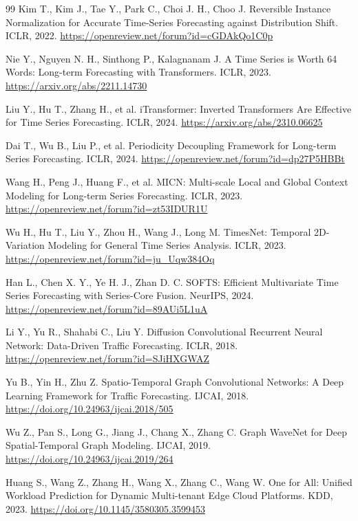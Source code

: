 \documentclass[UTF8]{ctexart}
\begin{document}
\begin{thebibliography}{99}
Kim T., Kim J., Tae Y., Park C., Choi J. H., Choo J. Reversible Instance Normalization for Accurate Time-Series Forecasting against Distribution Shift. ICLR, 2022. \url{https://openreview.net/forum?id=cGDAkQo1C0p}

Nie Y., Nguyen N. H., Sinthong P., Kalagnanam J. A Time Series is Worth 64 Words: Long-term Forecasting with Transformers. ICLR, 2023. \url{https://arxiv.org/abs/2211.14730}

Liu Y., Hu T., Zhang H., et al. iTransformer: Inverted Transformers Are Effective for Time Series Forecasting. ICLR, 2024. \url{https://arxiv.org/abs/2310.06625}

Dai T., Wu B., Liu P., et al. Periodicity Decoupling Framework for Long-term Series Forecasting. ICLR, 2024. \url{https://openreview.net/forum?id=dp27P5HBBt}

Wang H., Peng J., Huang F., et al. MICN: Multi-scale Local and Global Context Modeling for Long-term Series Forecasting. ICLR, 2023. \url{https://openreview.net/forum?id=zt53IDUR1U}

Wu H., Hu T., Liu Y., Zhou H., Wang J., Long M. TimesNet: Temporal 2D-Variation Modeling for General Time Series Analysis. ICLR, 2023. \url{https://openreview.net/forum?id=ju_Uqw384Oq}

Han L., Chen X. Y., Ye H. J., Zhan D. C. SOFTS: Efficient Multivariate Time Series Forecasting with Series-Core Fusion. NeurIPS, 2024. \url{https://openreview.net/forum?id=89AUi5L1uA}

Li Y., Yu R., Shahabi C., Liu Y. Diffusion Convolutional Recurrent Neural Network: Data-Driven Traffic Forecasting. ICLR, 2018. \url{https://openreview.net/forum?id=SJiHXGWAZ}

Yu B., Yin H., Zhu Z. Spatio-Temporal Graph Convolutional Networks: A Deep Learning Framework for Traffic Forecasting. IJCAI, 2018. \url{https://doi.org/10.24963/ijcai.2018/505}

Wu Z., Pan S., Long G., Jiang J., Chang X., Zhang C. Graph WaveNet for Deep Spatial-Temporal Graph Modeling. IJCAI, 2019. \url{https://doi.org/10.24963/ijcai.2019/264}

Huang S., Wang Z., Zhang H., Wang X., Zhang C., Wang W. One for All: Unified Workload Prediction for Dynamic Multi-tenant Edge Cloud Platforms. KDD, 2023. \url{https://doi.org/10.1145/3580305.3599453}


\end{thebibliography}
\end{document}
